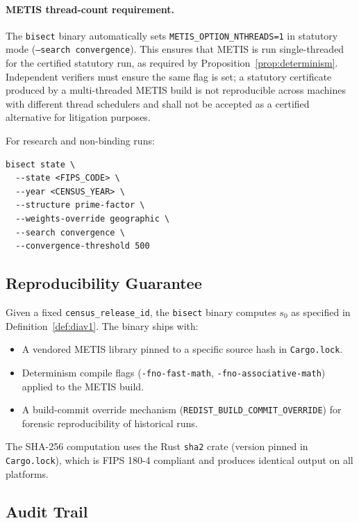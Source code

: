 \paragraph{METIS thread-count requirement.}
The \texttt{bisect} binary automatically sets \texttt{METIS\_OPTION\_NTHREADS=1}
in statutory mode (\texttt{--search convergence}).
This ensures that METIS is run single-threaded for the certified statutory run,
as required by Proposition~\ref{prop:determinism}.
Independent verifiers must ensure the same flag is set; a statutory certificate
produced by a multi-threaded METIS build is not reproducible across machines
with different thread schedulers and shall not be accepted as a certified
alternative for litigation purposes.

For research and non-binding runs:

\begin{verbatim}
bisect state \
  --state <FIPS_CODE> \
  --year <CENSUS_YEAR> \
  --structure prime-factor \
  --weights-override geographic \
  --search convergence \
  --convergence-threshold 500
\end{verbatim}

\subsection{Reproducibility Guarantee}

Given a fixed \texttt{census\_release\_id}, the \texttt{bisect} binary
computes $s_0$ as specified in Definition~\ref{def:diav1}.
The binary ships with:
\begin{itemize}
\item A vendored METIS library pinned to a specific source hash in
      \texttt{Cargo.lock}.
\item Determinism compile flags (\texttt{-fno-fast-math},
      \texttt{-fno-associative-math}) applied to the METIS build.
\item A build-commit override mechanism (\texttt{REDIST\_BUILD\_COMMIT\_OVERRIDE})
      for forensic reproducibility of historical runs.
\end{itemize}

The SHA-256 computation uses the Rust \texttt{sha2} crate (version pinned in
\texttt{Cargo.lock}), which is FIPS 180-4 compliant and produces identical
output on all platforms.

\subsection{Audit Trail}

